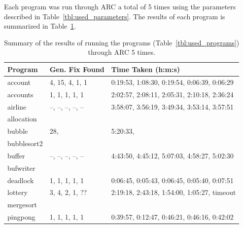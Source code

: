 \documentclass{llncs}
\begin{document}
Each program was run through ARC a total of 5 times using the parameters
described in Table~\ref{tbl:used_parameters}. The results of each program is
summarized in Table~\ref{tbl:summary_results}.

\begin{table}%
\caption{Summary of the results of running the programs
(Table~\ref{tbl:used_programs}) through ARC 5 times.}
\begin{center}
\lstset{basicstyle=\scriptsize}
\begin{tabular}{|l|l|l|}
\hline
\textbf{Program} & \textbf{Gen. Fix Found} & \textbf{Time Taken (h:m:s)}\\
\hline
account & 4, 15, 4, 1, 1 & 0:19:53, 1:08:30, 0:19:54, 0:06:39, 0:06:29\\
\hline
accounts & 1, 1, 1, 1, 1 & 2:02:57, 2:08:11, 2:05:31, 2:10:18, 2:36:24\\
\hline
airline & --, --, --, --, -- & 3:58:07, 3:56:19, 3:49:34, 3:53:14, 3:57:51\\
\hline
allocation &  & \\
\hline
bubble & 28, & 5:20:33, \\
\hline
bubblesort2 &  & \\
\hline
buffer & --, --, --, --, -- & 4:43:50, 4:45:12, 5:07:03, 4:58:27, 5:02:30\\
\hline
bufwriter &  & \\
\hline
deadlock & 1, 1, 1, 1, 1 & 0:06:45, 0:05:43, 0:06:45, 0:05:40, 0:07:51\\
\hline
lottery & 3, 4, 2, 1, ?? & 2:19:18, 2:43:18, 1:54:00, 1:05:27, timeout\\
\hline
mergesort & & \\
\hline
pingpong & 1, 1, 1, 1, 1 & 0:39:57, 0:12:47, 0:46:21, 0:46:16, 0:42:02\\
\hline
\end{tabular}
\label{tbl:summary_results}
\end{center}
\end{table}




\end{document}
